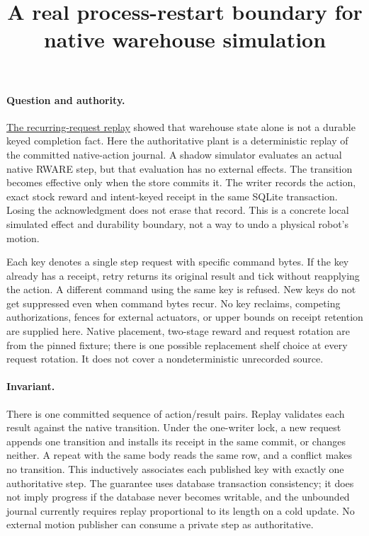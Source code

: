 \documentclass{article}
\title{A real process-restart boundary for native warehouse simulation}
\begin{document}
\maketitle

\paragraph{Question and authority.}
\href{https://github.com/eternal-november/eos-research-programmes/pull/632}{The recurring-request replay}
showed that warehouse state alone is not a durable keyed completion fact.
Here the authoritative plant is a deterministic replay of the committed
native-action journal. A shadow simulator evaluates an actual native
RWARE step, but that evaluation has no external effects. The transition
becomes effective only when the store commits it. The writer records the
action, exact stock reward and intent-keyed receipt in the same SQLite
transaction. Losing the acknowledgment does not erase that record. This
is a concrete local simulated effect and durability boundary, not a way
to undo a physical robot's motion.

Each key denotes a single step request with specific command bytes. If the
key already has a receipt, retry returns its original result and tick
without reapplying the action. A different command using the same key is
refused. New keys do not get suppressed even when command bytes recur.
No key reclaims, competing authorizations, fences for external actuators,
or upper bounds on receipt retention are supplied here. Native placement,
two-stage reward and request rotation are from the pinned fixture; there
is one possible replacement shelf choice at every request rotation. It
does not cover a nondeterministic unrecorded source.

\paragraph{Invariant.}
There is one committed sequence of action/result pairs. Replay validates
each result against the native transition. Under the one-writer lock,
a new request appends one transition and installs its receipt in the
same commit, or changes neither. A repeat with the same body reads the
same row, and a conflict makes no transition. This inductively associates
each published key with exactly one authoritative step. The guarantee
uses database transaction consistency; it does not imply progress if the
database never becomes writable, and the unbounded journal currently
requires replay proportional to its length on a cold update. No external
motion publisher can consume a private step as authoritative.
\end{document}
